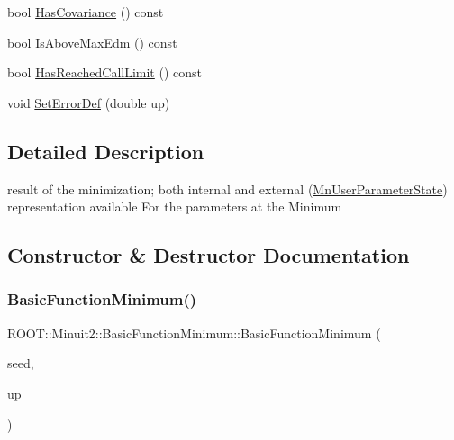 \begin{DoxyCompactItemize}
\item 
bool \mbox{\hyperlink{classROOT_1_1Minuit2_1_1BasicFunctionMinimum_ac876224368add09ceab711d3515fd959}{Has\+Covariance}} () const
\item 
bool \mbox{\hyperlink{classROOT_1_1Minuit2_1_1BasicFunctionMinimum_a6c37206680e19443048e8b398ef5ced8}{Is\+Above\+Max\+Edm}} () const
\item 
bool \mbox{\hyperlink{classROOT_1_1Minuit2_1_1BasicFunctionMinimum_ab26a12c388b15f056c9effa0abcd7639}{Has\+Reached\+Call\+Limit}} () const
\item 
void \mbox{\hyperlink{classROOT_1_1Minuit2_1_1BasicFunctionMinimum_ae89163fbfaccda743a6ca8d3add896dc}{Set\+Error\+Def}} (double up)
\end{DoxyCompactItemize}


\subsection{Detailed Description}
result of the minimization; both internal and external (\mbox{\hyperlink{classROOT_1_1Minuit2_1_1MnUserParameterState}{Mn\+User\+Parameter\+State}}) representation available For the parameters at the Minimum 

\subsection{Constructor \& Destructor Documentation}
\mbox{\label{classROOT_1_1Minuit2_1_1BasicFunctionMinimum_a7482d18115a4dc6cd3a0690074c7bbb7}} 
\subsubsection{\texorpdfstring{BasicFunctionMinimum()}{BasicFunctionMinimum()}\hspace{0.1cm}{\footnotesize\ttfamily [1/10]}}
{\footnotesize\ttfamily R\+O\+O\+T\+::\+Minuit2\+::\+Basic\+Function\+Minimum\+::\+Basic\+Function\+Minimum (\begin{DoxyParamCaption}\item[{const \mbox{\hyperlink{classROOT_1_1Minuit2_1_1MinimumSeed}{Minimum\+Seed}} \&}]{seed,  }\item[{double}]{up }\end{DoxyParamCaption})\hspace{0.3cm}{\ttfamily [inline]}}



